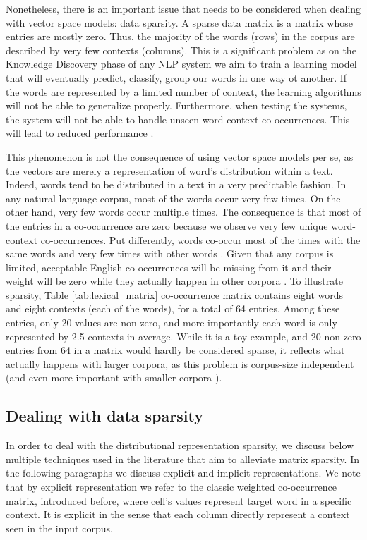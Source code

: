 Nonetheless, there is an important issue that needs to be considered when dealing with vector space models: data sparsity.  A sparse data matrix is a matrix whose entries are mostly zero. Thus, the majority of the words (rows) in the corpus are described by very few contexts (columns). This is a significant problem as on the Knowledge Discovery phase of any NLP system we aim to train a learning model that will eventually predict, classify, group our words in one way ot another. If the words are represented by a limited number of context, the learning algorithms will not be able to generalize properly. Furthermore, when testing the systems, the system will not be able to handle unseen word-context co-occurrences. This will lead to reduced performance \cite{phan2008learning}.

This phenomenon is not the consequence of using vector space models per se,  as the vectors are merely a representation of  word's distribution within a text. Indeed, words tend to be distributed in a text in a very predictable fashion. In any natural language corpus, most of the words occur very few times. On the other hand, very few words occur multiple times. The consequence is that most of the entries in a co-occurrence are zero because we observe very few unique word-context co-occurrences. Put differently, words co-occur most of the times with the same words and  very few times with other words \cite{sahlgren2006word}. Given that any corpus is limited, acceptable English co-occurrences will be missing from it and their weight will be zero while they  actually happen in other corpora \cite{JurafskyM17}. To illustrate sparsity, Table \ref{tab:lexical_matrix} co-occurrence matrix contains eight words and eight contexts (each of the words), for a total of 64 entries. Among these entries, only 20 values are non-zero, and more importantly each word is only represented  by 2.5 contexts in average. While it is a toy example, and 20 non-zero entries from 64 in a matrix would hardly be considered sparse, it reflects what actually happens with larger corpora, as this problem is corpus-size independent (and even more important with smaller corpora \cite{perinet2015}). 

\subsection{Dealing with data sparsity}
In order to deal with the distributional representation sparsity, we discuss below multiple techniques used in the literature \cite{sahlgren2006word,RatinovR09,piero2017} that aim to alleviate matrix sparsity.  In the following paragraphs we discuss explicit and implicit representations. We note that by explicit representation we refer to the classic weighted co-occurrence matrix, introduced before, where cell's values represent target word in a specific context. It is explicit in the sense that each column directly represent a context seen in the input corpus.
%


